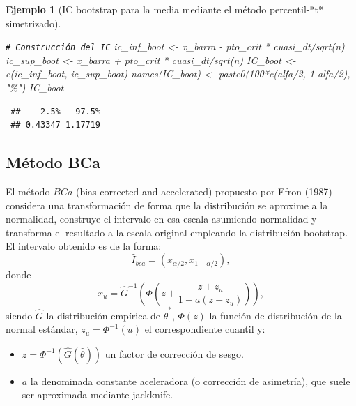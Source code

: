 \documentclass[
  10pt,
]{book}
\newenvironment{Shaded}{\begin{snugshade}}{\end{snugshade}}
\newcommand{\CommentTok}[1]{\textcolor[rgb]{0.56,0.35,0.01}{\textit{#1}}}
\newcommand{\DecValTok}[1]{\textcolor[rgb]{0.00,0.00,0.81}{#1}}
\newcommand{\FunctionTok}[1]{\textcolor[rgb]{0.00,0.00,0.00}{#1}}
\newcommand{\NormalTok}[1]{#1}
\newcommand{\OtherTok}[1]{\textcolor[rgb]{0.56,0.35,0.01}{#1}}
\newcommand{\SpecialCharTok}[1]{\textcolor[rgb]{0.00,0.00,0.00}{#1}}
\newcommand{\StringTok}[1]{\textcolor[rgb]{0.31,0.60,0.02}{#1}}
\providecommand{\tightlist}{%
  \setlength{\itemsep}{0pt}\setlength{\parskip}{0pt}}
\theoremstyle{break}
\newtheorem{example}{Ejemplo}[chapter]
\theoremstyle{nonumberplain}
\renewcommand{\CommentTok}[1]{\textcolor[rgb]{0.41,0.41,0.41}{\texttt{#1}}}
\begin{document}
\begin{example}[IC bootstrap para la media mediante el método percentil-*t* simetrizado]
\begin{Shaded}
\begin{Highlighting}[]
\CommentTok{\# Construcción del IC}
\NormalTok{ic\_inf\_boot }\OtherTok{\textless{}{-}}\NormalTok{ x\_barra }\SpecialCharTok{{-}}\NormalTok{ pto\_crit }\SpecialCharTok{*}\NormalTok{ cuasi\_dt}\SpecialCharTok{/}\FunctionTok{sqrt}\NormalTok{(n)}
\NormalTok{ic\_sup\_boot }\OtherTok{\textless{}{-}}\NormalTok{ x\_barra }\SpecialCharTok{+}\NormalTok{ pto\_crit }\SpecialCharTok{*}\NormalTok{ cuasi\_dt}\SpecialCharTok{/}\FunctionTok{sqrt}\NormalTok{(n)}
\NormalTok{IC\_boot }\OtherTok{\textless{}{-}} \FunctionTok{c}\NormalTok{(ic\_inf\_boot, ic\_sup\_boot)}
\FunctionTok{names}\NormalTok{(IC\_boot) }\OtherTok{\textless{}{-}} \FunctionTok{paste0}\NormalTok{(}\DecValTok{100}\SpecialCharTok{*}\FunctionTok{c}\NormalTok{(alfa}\SpecialCharTok{/}\DecValTok{2}\NormalTok{, }\DecValTok{1}\SpecialCharTok{{-}}\NormalTok{alfa}\SpecialCharTok{/}\DecValTok{2}\NormalTok{), }\StringTok{"\%"}\NormalTok{)}
\NormalTok{IC\_boot}
\end{Highlighting}
\end{Shaded}

\begin{verbatim}
 ##    2.5%   97.5% 
 ## 0.43347 1.17719
\end{verbatim}

\end{example}

\hypertarget{boot-ic-bca}{%
\subsection{Método BCa}\label{boot-ic-bca}}

El método \(BCa\) (bias-corrected and accelerated) propuesto por Efron (1987) considera una transformación de forma que la distribución se aproxime a la normalidad, construye el intervalo en esa escala asumiendo normalidad y transforma el resultado a la escala original empleando la distribución bootstrap.
El intervalo obtenido es de la forma:
\[\hat{I}_{bca}=\left( x_{\alpha /2}, x_{1-\alpha /2}  \right),\]
donde\\
\[x_u = \hat G^{-1}\left(\Phi\left(z + \frac{z + z_u}{1-a(z+z_u)}\right)  \right),\]
siendo \(\hat G\) la distribución empírica de \(\hat{\theta}^{\ast}\), \(\Phi(z)\) la función de distribución de la normal estándar, \(z_u = \Phi^{-1}(u)\) el correspondiente cuantil y:

\begin{itemize}
\tightlist
\item
  \(z = \Phi^{-1}(\hat G(\hat\theta))\) un factor de corrección de sesgo.
\item
  \(a\) la denominada constante aceleradora (o corrección de asimetría), que suele ser aproximada mediante jackknife.
\end{itemize}
\end{document}

